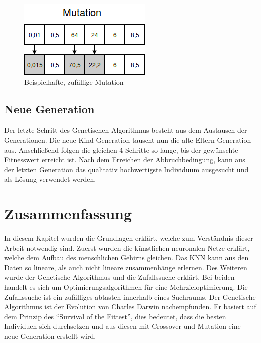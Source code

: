 \begin{figure}[H]
  \centering  
  \includegraphics[scale=0.9]{img/mutation.png}
  \caption{Beispielhafte, zufällige Mutation}
  \label{fig:chromoson_mutation}
\end{figure}

 
\subsection{Neue Generation}
Der letzte Schritt des Genetischen Algorithmus besteht aus dem Austausch der Generationen. Die neue Kind-Generation tauscht nun die alte Eltern-Generation aus. Anschließend folgen die gleichen 4 Schritte so lange, bis der gewünschte Fitnesswert erreicht ist. Nach dem Erreichen der Abbruchbedingung, kann aus der letzten Generation das qualitativ hochwertigste Individuum ausgesucht und als Lösung verwendet werden.


\section{Zusammenfassung}
In diesem Kapitel wurden die Grundlagen erklärt, welche zum Verständnis dieser Arbeit notwendig sind. Zuerst wurden die künstlichen neuronalen Netze erklärt, welche dem Aufbau des menschlichen Gehirns gleichen. Das KNN kann aus den Daten so lineare, als auch nicht lineare zusammenhänge erlernen. Des Weiteren wurde der Genetische Algorithmus und die Zufallssuche erklärt. Bei beiden handelt es sich um Optimierungsalgorithmen für eine Mehrzieloptimierung. Die Zufallssuche ist ein zufälliges abtasten innerhalb eines Suchraums. Der Genetische Algorithmus ist der Evolution von Charles Darwin nachempfunden. Er basiert auf dem Prinzip des "`Survival of the Fittest"', dies bedeutet, dass die besten Individuen sich durchsetzen und aus diesen mit Crossover und Mutation eine neue Generation erstellt wird.